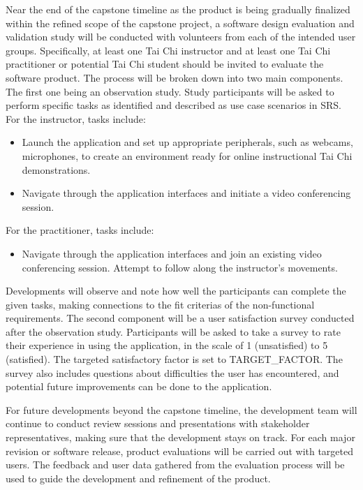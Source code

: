 \documentclass[12pt, titlepage]{article}
\begin{document}
Near the end of the capstone timeline as the product is being gradually
finalized within the refined scope of the capstone project, a software design
evaluation and validation study will be conducted with volunteers from each of
the intended user groups. Specifically, at least one Tai Chi instructor and at
least one Tai Chi practitioner or potential Tai Chi student should be invited to
evaluate the software product. The process will be broken down into two main
components. The first one being an observation study. Study participants will be
asked to perform specific tasks as identified and described as use case
scenarios in SRS. For the instructor, tasks include:
\begin{itemize}
\item Launch the application and set up appropriate peripherals, such as webcams,
  microphones, to create an environment ready for online instructional Tai Chi
  demonstrations.
\item Navigate through the application interfaces and initiate a video conferencing
  session.
\end{itemize}
For the practitioner, tasks include:
\begin{itemize}
\item Navigate through the application interfaces and join an existing video
  conferencing session. Attempt to follow along the instructor’s movements.
\end{itemize}
Developments will observe and note how well the participants can complete the
given tasks, making connections to the fit criterias of the non-functional
requirements. The second component will be a user satisfaction survey conducted
after the observation study. Participants will be asked to take a survey to rate
their experience in using the application, in the scale of 1 (unsatisfied) to 5
(satisfied). The targeted satisfactory factor is set to TARGET\_FACTOR. The
survey also includes questions about difficulties the user has encountered, and
potential future improvements can be done to the application.

For future developments beyond the capstone timeline, the development team will
continue to conduct review sessions and presentations with stakeholder
representatives, making sure that the development stays on track. For each major
revision or software release, product evaluations will be carried out with
targeted users. The feedback and user data gathered from the evaluation process
will be used to guide the development and refinement of the product.
\end{document}
